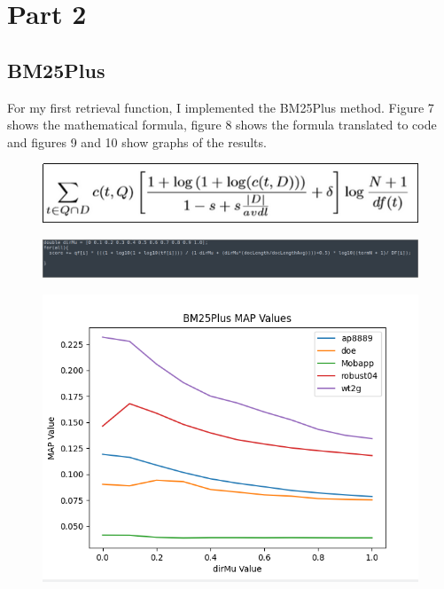 \documentclass{article}
\begin{document}
\section*{Part 2}
\subsection*{BM25Plus}
For my first retrieval function, I implemented the BM25Plus method.  Figure 7 shows the mathematical formula, figure 8 shows the formula translated to code and figures 9 and 10 show graphs of the results.\\

\begin{figure}[h!]
\centering
\includegraphics[scale=0.45]{BM25Plus_FORMULA_MATH.png}
\caption{}
\end{figure}

\begin{figure}[h!]
\centering
\includegraphics[scale=0.45]{BM25Plus_FORMULA.png}
\caption{}
\end{figure}

\begin{figure}[h!]
\centering
\includegraphics[scale=0.40]{BM25Plus_MAP_VALUES.png}
\caption{}
\end{figure}
\end{document}
